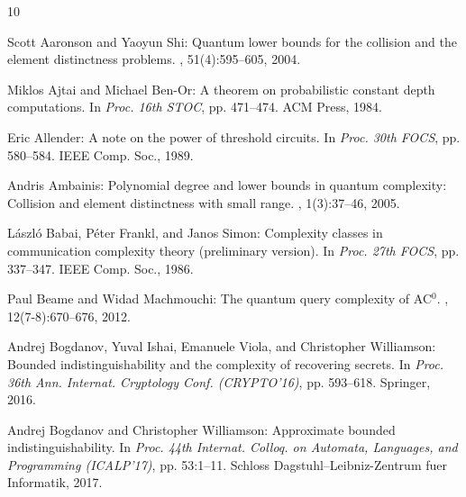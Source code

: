 \documentclass[11pt]{article}
\numberwithin{equation}{section}
\theoremstyle{definition}
\theoremstyle{plain}
\begin{document}
\tocrefpdfbookmark
\begin{thebibliography}{10}

{\sc Scott Aaronson and Yaoyun Shi}: Quantum lower bounds for the collision and
  the element distinctness problems.
, 51(4):595--605, 2004.
\newblock [\epfmtdoi{10.1145/1008731.1008735}]

{\sc Miklos Ajtai and Michael Ben-Or}: A theorem on probabilistic constant
  depth computations.
\newblock In {\em Proc. 16th STOC}, pp. 471--474. ACM Press, 1984.
\newblock [\epfmtdoi{10.1145/800057.808715}]

{\sc Eric Allender}: A note on the power of threshold circuits.
\newblock In {\em Proc. 30th FOCS}, pp. 580--584. IEEE Comp. Soc., 1989.

{\sc Andris Ambainis}: Polynomial degree and lower bounds in quantum
  complexity: Collision and element distinctness with small range.
, 1(3):37--46, 2005.

{\sc L{\'{a}}szl{\'{o}} Babai, P{\'e}ter Frankl, and Janos Simon}: Complexity
  classes in communication complexity theory (preliminary version).
\newblock In {\em Proc. 27th FOCS}, pp. 337--347. IEEE Comp. Soc., 1986.

{\sc Paul Beame and Widad Machmouchi}: The quantum query complexity of
  {AC}$^0$.
, 12(7-8):670--676, 2012.

{\sc Andrej Bogdanov, Yuval Ishai, Emanuele Viola, and Christopher Williamson}:
  Bounded indistinguishability and the complexity of recovering secrets.
\newblock In {\em Proc. 36th Ann. Internat. Cryptology Conf. (CRYPTO'16)}, pp.
  593--618. Springer, 2016.

{\sc Andrej Bogdanov and Christopher Williamson}: Approximate bounded
  indistinguishability.
\newblock In {\em Proc. 44th Internat. Colloq. on Automata, Languages, and
  Programming (ICALP'17)}, pp. 53:1--11. Schloss Dagstuhl--Leibniz-Zentrum fuer
  Informatik, 2017.


\end{thebibliography}
\end{document}
